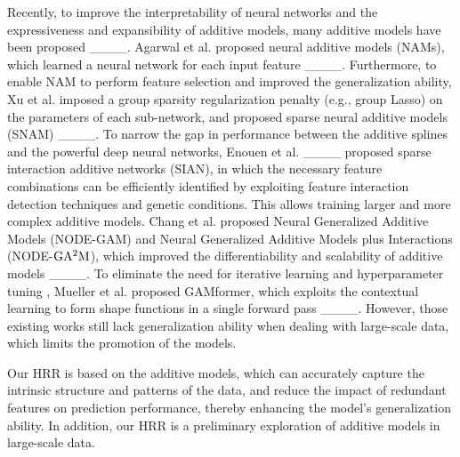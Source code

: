 Recently, to improve the interpretability of neural networks and the expressiveness and expansibility of additive models, many additive models have been proposed ____.  Agarwal et al. proposed neural additive models (NAMs), which learned a neural network for each input feature ____.  Furthermore,  to enable NAM to perform feature selection and improved the generalization ability, Xu et al. imposed a group sparsity regularization penalty (e.g., group Lasso) on the parameters of each sub-network, and proposed sparse neural additive models (SNAM) ____.  To narrow the gap in performance between the additive splines and the powerful deep neural networks, Enouen et al. ____  proposed sparse interaction additive networks (SIAN), in which the necessary feature combinations can be efficiently identified by exploiting feature interaction detection techniques and genetic conditions. This allows training larger and more complex additive models.  Chang et al.  proposed Neural Generalized Additive Models (NODE-GAM) and Neural Generalized Additive Models plus Interactions (NODE-$\rm{GA^2M}$),  which improved the differentiability and scalability of additive models ____. To eliminate the need for iterative learning and hyperparameter tuning , Mueller et al. proposed GAMformer,  which exploits the contextual learning to form shape functions in a single forward pass ____. However, those existing works still lack generalization ability when dealing with large-scale data, which limits the promotion of the models.


Our HRR is based on the additive models, which can accurately capture the intrinsic structure and patterns of the data, and reduce the impact of redundant features on prediction performance, thereby enhancing the model's generalization ability. In addition, our HRR is a preliminary exploration of additive models in large-scale data.